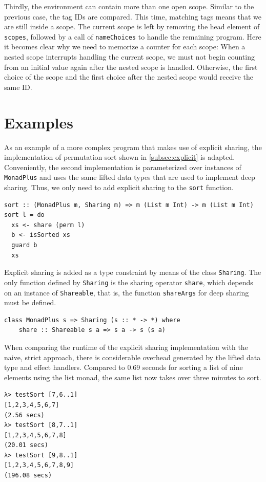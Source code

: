 \documentclass[a4paper, 11pt, fleqn, twoside, abstract=on]{scrreprt}
\newcommand{\hinl}[1]{\texttt{#1}}
\begin{document}
Thirdly, the environment can contain more than one open scope.
Similar to the previous case, the tag IDs are compared.
This time, matching tags means that we are still inside a scope.
The current scope is left by removing the head element of \hinl{scopes}, followed by a call of \hinl{nameChoices} to handle the remaining program.
Here it becomes clear why we need to memorize a counter for each scope: When a nested scope interrupts handling the current scope, we must not begin counting from an initial value again after the nested scope is handled.
Otherwise, the first choice of the scope and the first choice after the nested scope would receive the same ID.

\section{Examples}

As an example of a more complex program that makes use of explicit sharing, the implementation of permutation sort shown in \autoref{subsec:explicit} is adapted.
Conveniently, the second implementation is parameterized over instances of \hinl{MonadPlus} and uses the same lifted data types that are used to implement deep sharing.
Thus, we only need to add explicit sharing to the \hinl{sort} function.

\begin{verbatim}
sort :: (MonadPlus m, Sharing m) => m (List m Int) -> m (List m Int)
sort l = do
  xs <- share (perm l)
  b <- isSorted xs
  guard b
  xs
\end{verbatim}
\noindent
Explicit sharing is added as a type constraint by means of the class \hinl{Sharing}.
The only function defined by \hinl{Sharing} is the sharing operator \hinl{share}, which depends on an instance of \hinl{Shareable}, that is, the function \hinl{shareArgs} for deep sharing must be defined.

\begin{verbatim}
class MonadPlus s => Sharing (s :: * -> *) where
    share :: Shareable s a => s a -> s (s a)
\end{verbatim}

When comparing the runtime of the explicit sharing implementation with the naive, strict approach, there is considerable overhead generated by the lifted data type and effect handlers.
Compared to 0.69 seconds for sorting a list of nine elements using the list monad, the same list now takes over three minutes to sort.

\begin{verbatim}
λ> testSort [7,6..1]
[1,2,3,4,5,6,7]
(2.56 secs)
λ> testSort [8,7..1]
[1,2,3,4,5,6,7,8]
(20.01 secs)
λ> testSort [9,8..1]
[1,2,3,4,5,6,7,8,9]
(196.08 secs)
\end{verbatim}
\end{document}
